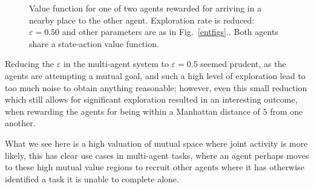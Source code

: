 \documentclass{article}
\begin{document}
\begin{figure}[ht]
\centering
{}
	\caption{Value function for one of two agents rewarded for arriving in a nearby place to the other agent. Exploration rate is reduced: $\varepsilon = 0.50$ and other parameters are 
	as in Fig.~\ref{entfigs}.\label{social}. 
	Both agents share a state-action value function.}
\end{figure}

Reducing the $\varepsilon$ in the multi-agent system to $\varepsilon = 0.5$ seemed prudent, as the agents are attempting a mutual goal, and such a high level of exploration lead to too much noise to obtain anything reasonable; however, even this small reduction which still allows for significant exploration resulted in an interesting outcome, when rewarding the agents for being within a Manhattan distance of $5$ from one another.

What we see here is a high valuation of mutual space where joint activity is more likely, this has clear use cases in multi-agent tasks, where an agent perhaps moves to these high mutual value regions to recruit other agents where it has otherwise identified a task it is unable to complete alone.
\end{document}
